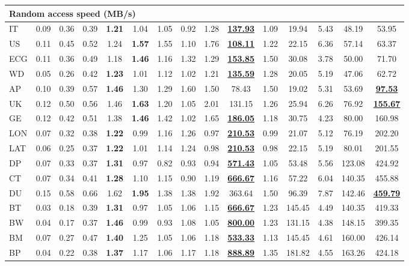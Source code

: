 \begin{table*}[htbp]
\begin{tabular}{@{}l *{14}{c}@{}}
\midrule
\multicolumn{15}{l}{\textbf{Random access speed (MB/s)}} \\
\midrule
IT & 0.09 & 0.36 & 0.39 & \textbf{1.21} & 1.04 & 1.05 & 0.92 & 1.28 & \underline{\textbf{137.93}} & 1.09 & 19.94 & 5.43 & 48.19 & 53.95 \\
US & 0.11 & 0.45 & 0.52 & 1.24 & \textbf{1.57} & 1.55 & 1.10 & 1.76 & \underline{\textbf{108.11}} & 1.22 & 22.15 & 6.36 & 57.14 & 63.37 \\
ECG & 0.11 & 0.36 & 0.49 & 1.18 & \textbf{1.46} & 1.16 & 1.32 & 1.29 & \underline{\textbf{153.85}} & 1.50 & 30.08 & 3.78 & 50.00 & 71.70 \\
WD & 0.05 & 0.26 & 0.42 & \textbf{1.23} & 1.01 & 1.12 & 1.02 & 1.21 & \underline{\textbf{135.59}} & 1.28 & 20.05 & 5.19 & 47.06 & 62.72 \\
AP & 0.10 & 0.39 & 0.57 & \textbf{1.46} & 1.30 & 1.29 & 1.60 & 1.50 & 78.43 & 1.50 & 19.02 & 5.31 & 53.69 & \underline{\textbf{97.53}} \\
UK & 0.12 & 0.50 & 0.56 & 1.46 & \textbf{1.63} & 1.20 & 1.05 & 2.01 & 131.15 & 1.26 & 25.94 & 6.26 & 76.92 & \underline{\textbf{155.67}} \\
GE & 0.12 & 0.42 & 0.51 & 1.38 & \textbf{1.46} & 1.42 & 1.02 & 1.65 & \underline{\textbf{186.05}} & 1.18 & 30.75 & 4.23 & 80.00 & 160.98 \\
LON & 0.07 & 0.32 & 0.38 & \textbf{1.22} & 0.99 & 1.16 & 1.26 & 0.97 & \underline{\textbf{210.53}} & 0.99 & 21.07 & 5.12 & 76.19 & 202.20 \\
LAT & 0.06 & 0.25 & 0.37 & \textbf{1.22} & 1.01 & 1.14 & 1.24 & 0.98 & \underline{\textbf{210.53}} & 0.98 & 22.15 & 5.19 & 80.01 & 201.55 \\
DP & 0.07 & 0.33 & 0.37 & \textbf{1.31} & 0.97 & 0.82 & 0.93 & 0.94 & \underline{\textbf{571.43}} & 1.05 & 53.48 & 5.56 & 123.08 & 424.92 \\
CT & 0.07 & 0.34 & 0.41 & \textbf{1.28} & 1.10 & 1.15 & 0.90 & 1.19 & \underline{\textbf{666.67}} & 1.16 & 57.22 & 6.04 & 140.35 & 455.88 \\
DU & 0.15 & 0.58 & 0.66 & 1.62 & \textbf{1.95} & 1.38 & 1.38 & 1.92 & 363.64 & 1.50 & 96.39 & 7.87 & 142.46 & \underline{\textbf{459.79}} \\
BT & 0.03 & 0.18 & 0.39 & \textbf{1.31} & 0.97 & 1.05 & 1.06 & 1.15 & \underline{\textbf{666.67}} & 1.23 & 145.45 & 4.49 & 140.35 & 419.33 \\
BW & 0.04 & 0.17 & 0.37 & \textbf{1.46} & 0.99 & 0.93 & 1.08 & 1.05 & \underline{\textbf{800.00}} & 1.23 & 131.15 & 4.38 & 148.15 & 399.35 \\
BM & 0.07 & 0.27 & 0.47 & \textbf{1.40} & 1.25 & 1.05 & 1.06 & 1.18 & \underline{\textbf{533.33}} & 1.13 & 145.45 & 4.61 & 160.00 & 426.14 \\
BP & 0.04 & 0.22 & 0.38 & \textbf{1.37} & 1.17 & 1.06 & 1.17 & 1.18 & \underline{\textbf{888.89}} & 1.35 & 181.82 & 4.55 & 163.26 & 424.18 \\
\bottomrule
\end{tabular}
\end{table*}

